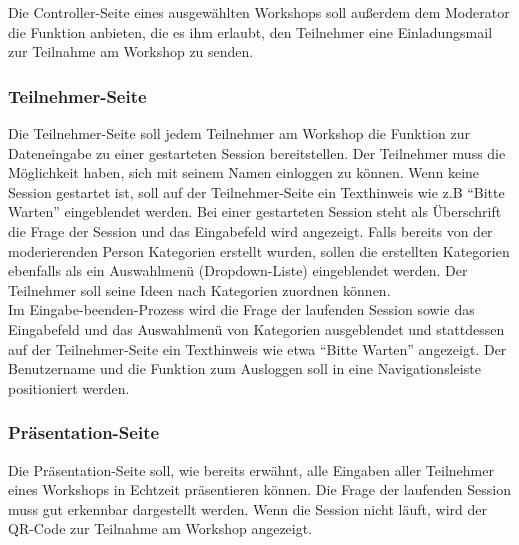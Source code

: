 Die Controller-Seite eines ausgewählten Workshops soll außerdem dem Moderator die Funktion anbieten, die es ihm erlaubt, den Teilnehmer eine Einladungsmail zur Teilnahme am Workshop zu senden.

\subsubsection*{Teilnehmer-Seite}
Die Teilnehmer-Seite soll jedem Teilnehmer am Workshop die Funktion zur Dateneingabe zu einer gestarteten Session bereitstellen. Der Teilnehmer muss die Möglichkeit haben, sich mit seinem Namen einloggen zu können. Wenn keine Session gestartet ist, soll auf der Teilnehmer-Seite ein Texthinweis wie z.B “Bitte Warten” eingeblendet werden. Bei einer gestarteten Session steht als Überschrift die Frage der Session und das Eingabefeld wird angezeigt. Falls bereits von der moderierenden Person Kategorien erstellt wurden, sollen die erstellten Kategorien ebenfalls als ein Auswahlmenü (Dropdown-Liste) eingeblendet werden. Der Teilnehmer soll seine Ideen nach Kategorien zuordnen können. 
\\

Im Eingabe-beenden-Prozess wird die Frage der laufenden Session sowie das Eingabefeld und das Auswahlmenü von Kategorien ausgeblendet und stattdessen auf der Teilnehmer-Seite ein Texthinweis wie etwa “Bitte Warten” angezeigt. Der Benutzername und die Funktion zum Ausloggen soll in eine Navigationsleiste positioniert werden.

\subsubsection*{Präsentation-Seite}
Die Präsentation-Seite soll, wie bereits erwähnt, alle Eingaben aller Teilnehmer eines Workshops in Echtzeit präsentieren können. Die Frage der laufenden Session muss gut erkennbar dargestellt werden. Wenn die Session nicht läuft, wird der QR-Code zur Teilnahme am Workshop angezeigt.\\

